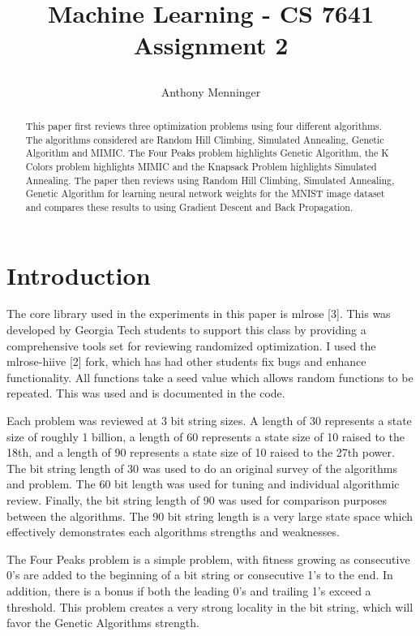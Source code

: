 \documentclass[letterpaper]{article} %
\title{
Machine Learning - CS 7641
Assignment 2
	
}
\author {
    Anthony Menninger \\
}
\begin{document}
\maketitle

\begin{abstract}
This paper first reviews three optimization problems using four different algorithms. The algorithms considered are Random Hill Climbing, Simulated Annealing, Genetic Algorithm and MIMIC.  The Four Peaks problem highlights Genetic Algorithm, the K Colors problem highlights MIMIC and the Knapsack Problem highlights Simulated Annealing.  The paper then reviews using Random Hill Climbing, Simulated Annealing, Genetic Algorithm for learning neural network weights for the MNIST image dataset and compares these results to using Gradient Descent and Back Propagation.  
\end{abstract}

\section{Introduction}
The core library used in the experiments in this paper is mlrose [3].  This was developed by Georgia Tech students to support this class by providing a comprehensive tools set for reviewing randomized optimization.  I used the mlrose-hiive [2] fork, which has had other students fix bugs and enhance functionality.  All functions take a seed value which allows random functions to be repeated.  This was used and is documented in the code.

Each problem was reviewed at 3 bit string sizes.   A length of 30 represents a state size of roughly 1 billion, a length of 60 represents a state size of 10 raised to the 18th, and a length of 90 represents a state size of 10 raised to the 27th power.  The bit string length of 30 was used to do an original survey of the algorithms and problem.  The 60 bit length was used for tuning and individual algorithmic review.  Finally, the bit string length of 90 was used for comparison purposes between the algorithms.  The 90 bit string length is a very large state space which effectively demonstrates each algorithms strengths and weaknesses. 

The Four Peaks problem is a simple problem, with fitness growing as consecutive 0's are added to the beginning of a bit string or consecutive 1's to the end.  In addition, there is a bonus if both the leading 0's and trailing 1's exceed a threshold.  This problem creates a very strong locality in the bit string, which will favor the Genetic Algorithms strength.  
\end{document}
